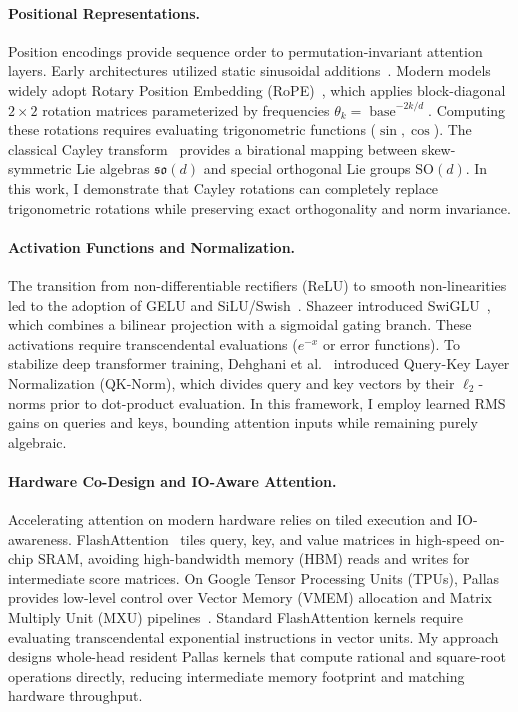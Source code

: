\documentclass[11pt,a4paper]{article}
\theoremstyle{definition}
\newcommand{\SO}{\mathrm{SO}}
\newcommand{\so}{\mathfrak{so}}
\begin{document}
\paragraph{Positional Representations.}
Position encodings provide sequence order to permutation-invariant attention layers. Early architectures utilized static sinusoidal additions~\citep{vaswani2017attention}. Modern models widely adopt Rotary Position Embedding (RoPE)~\citep{su2024roformer}, which applies block-diagonal $2\times 2$ rotation matrices parameterized by frequencies $\theta_k = \operatorname{base}^{-2k/d}$. Computing these rotations requires evaluating trigonometric functions ($\sin, \cos$). The classical Cayley transform~\citep{cayley1846sur} provides a birational mapping between skew-symmetric Lie algebras $\so(d)$ and special orthogonal Lie groups $\SO(d)$. In this work, I demonstrate that Cayley rotations can completely replace trigonometric rotations while preserving exact orthogonality and norm invariance.

\paragraph{Activation Functions and Normalization.}
The transition from non-differentiable rectifiers (ReLU) to smooth non-linearities led to the adoption of GELU and SiLU/Swish~\citep{dauphin2017language}. Shazeer introduced SwiGLU~\citep{shazeer2020glu}, which combines a bilinear projection with a sigmoidal gating branch. These activations require transcendental evaluations ($e^{-x}$ or error functions). To stabilize deep transformer training, Dehghani et al.~\citep{dehghani2023scaling} introduced Query-Key Layer Normalization (QK-Norm), which divides query and key vectors by their $\ell_2$-norms prior to dot-product evaluation. In this framework, I employ learned RMS gains on queries and keys, bounding attention inputs while remaining purely algebraic.

\paragraph{Hardware Co-Design and IO-Aware Attention.}
Accelerating attention on modern hardware relies on tiled execution and IO-awareness. FlashAttention~\citep{dao2022flashattention,dao2023flashattention2} tiles query, key, and value matrices in high-speed on-chip SRAM, avoiding high-bandwidth memory (HBM) reads and writes for intermediate score matrices. On Google Tensor Processing Units (TPUs), Pallas provides low-level control over Vector Memory (VMEM) allocation and Matrix Multiply Unit (MXU) pipelines~\citep{jouppi2023tpu4}. Standard FlashAttention kernels require evaluating transcendental exponential instructions in vector units. My approach designs whole-head resident Pallas kernels that compute rational and square-root operations directly, reducing intermediate memory footprint and matching hardware throughput.
\end{document}
